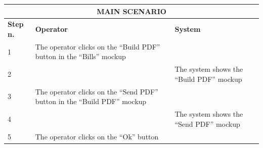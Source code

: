 {{{			\begin{table}[h]
			\begin{tabular}{|p{2cm}|p{6cm}|p{6cm}|}
			\hline
				\multicolumn{3}{|c|}{MAIN SCENARIO}\\
			\hline
				\centering \vspace{1mm} \bfseries{Step n.} \vspace{1mm} & \vspace{1mm} \bfseries{Operator} \vspace{1mm} & \vspace{1mm} \bfseries{System} \vspace{1mm}\\
			\hline
				\vspace{1mm} 1 \vspace{1mm} &
				\vspace{1mm} The operator clicks on the “Build PDF” button in the “Bills” mockup\vspace{1mm} & 
				\vspace{1mm} \vspace{1mm} \\
			\hline
				\vspace{1mm} 2 \vspace{1mm} &
				\vspace{1mm} \vspace{1mm} & 
				\vspace{1mm} The system shows the “Build PDF” mockup\vspace{1mm} \\
			\hline
				\vspace{1mm} 3\vspace{1mm} &
				\vspace{1mm} The operator clicks on the “Send PDF” button in the “Build PDF” mockup\vspace{1mm} & 
				\vspace{1mm} \vspace{1mm} \\
			\hline
				\vspace{1mm} 4\vspace{1mm} &
				\vspace{1mm} \vspace{1mm} & 
				\vspace{1mm} The system shows the “Send PDF” mockup\vspace{1mm} \\
			\hline
				\vspace{1mm} 5\vspace{1mm} &
				\vspace{1mm} The operator clicks on the “Ok” button\vspace{1mm} & 

\end{tabular}
\end{table}}}}

